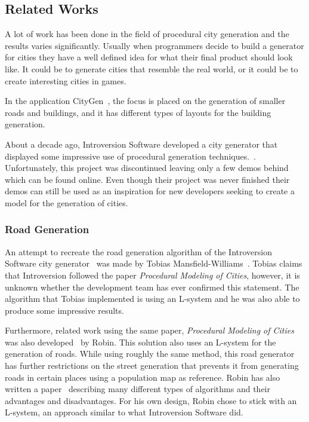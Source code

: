 \subsection{Related Works}
A lot of work has been done in the field of procedural city generation and the results varies significantly.
Usually when programmers decide to build a generator for cities they have a well defined idea for what their final product should look like.
It could be to generate cities that resemble the real world, or it could be to create interesting cities in games.

In the application CityGen~\cite{citygen}, the focus is placed on the generation of smaller roads and buildings, and it has different types of layouts for the building generation.

About a decade ago, Introversion Software developed a city generator that displayed some impressive use of procedural generation techniques.~\cite{citygen_subversion}. 
Unfortunately, this project was discontinued leaving only a few demos behind which can be found online.
Even though their project was never finished their demos can still be used as an inspiration for new developers seeking to create a model for the generation of cities.
 

\subsubsection{Road Generation}
An attempt to recreate the road generation algorithm of the Introversion Software city generator~\cite{citygen_subversion} was made by Tobias Mansfield-Williams~\cite{citygen_tobias}. 
Tobias claims that Introversion followed the paper \textit{Procedural Modeling of Cities}, however, it is unknown whether the development team has ever confirmed this statement. 
The algorithm that Tobias implemented is using an L-system and he was also  able to produce some impressive results.

Furthermore, related work using the same paper,  \textit{Procedural Modeling of Cities} was also developed~\cite{citygen_robin} by Robin. 
This solution also uses an L-system for the generation of roads. 
While using roughly the same method, this road generator has further restrictions on the street generation that prevents it from generating roads in certain places using a population map as reference.
Robin has also written a paper~\cite{citygen_robin_paper} describing many different types of algorithms and their advantages and disadvantages. 
For his own design, Robin chose to stick with an L-system, an approach similar to what Introversion Software did. 


